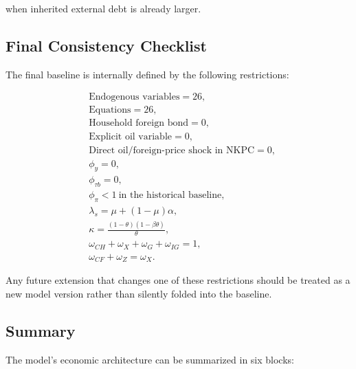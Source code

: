 when inherited external debt is already larger.

\subsection{Final Consistency Checklist}
\label{app:consistency_checklist}

The final baseline is internally defined by the following restrictions:

\begin{align}
&\text{Endogenous variables}=26,\\
&\text{Equations}=26,\\
&\text{Household foreign bond}=0,\\
&\text{Explicit oil variable}=0,\\
&\text{Direct oil/foreign-price shock in NKPC}=0,\\
&\phi_y=0,\\
&\phi_{\tau b}=0,\\
&\phi_\pi<1\ \text{in the historical baseline},\\
&\lambda_s=\mu+(1-\mu)\alpha,\\
&\kappa=\frac{(1-\theta)(1-\beta\theta)}{\theta},\\
&\omega_{CH}+\omega_X+\omega_G+\omega_{IG}=1,\\
&\omega_{CF}+\omega_Z=\omega_X.
\end{align}

Any future extension that changes one of these restrictions should be treated
as a new model version rather than silently folded into the baseline.

\subsection{Summary}
\label{app:summary}

The model's economic architecture can be summarized in six blocks:

